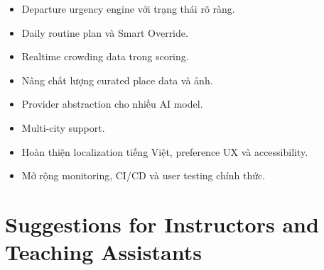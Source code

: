 \begin{itemize}
  \item Departure urgency engine với trạng thái rõ ràng.
  \item Daily routine plan và Smart Override.
  \item Realtime crowding data trong scoring.
  \item Nâng chất lượng curated place data và ảnh.
  \item Provider abstraction cho nhiều AI model.
  \item Multi-city support.
  \item Hoàn thiện localization tiếng Việt, preference UX và accessibility.
  \item Mở rộng monitoring, CI/CD và user testing chính thức.
\end{itemize}

\section{Suggestions for Instructors and Teaching Assistants}

